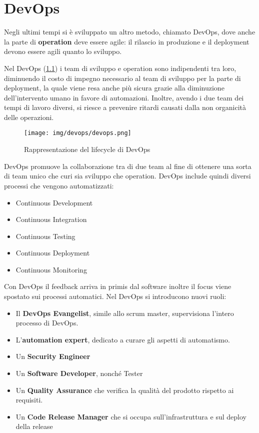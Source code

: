 \chapter{DevOps}
Negli ultimi tempi si è sviluppato un altro metodo, chiamato DevOps, dove anche la parte di \textbf{operation} deve essere agile: il rilascio in produzione e il deployment devono essere agili quanto lo
sviluppo.

Nel DevOps (\ref{fig:devops}) i team di sviluppo e operation sono indipendenti tra loro, diminuendo il costo di impegno necessario al team di sviluppo per la parte di deployment, la quale viene resa anche più sicura grazie alla diminuzione dell’intervento umano in favore di automazioni. Inoltre, avendo i due team dei tempi di lavoro diversi, si riesce a prevenire ritardi causati dalla non organicità delle operazioni.

\begin{figure}[!ht]
    \centering
    \texttt{[image: img/devops/devops.png]}
    \caption{Rappresentazione del lifecycle di DevOps}
    \label{fig:devops}
\end{figure}

DevOps promuove la collaborazione tra di due team al fine di ottenere una sorta di team unico che curi sia sviluppo che operation. DevOps include quindi diversi processi che vengono automatizzati:
\begin{itemize}
    \item Continuous Development
    \item Continuous Integration
    \item Continuous Testing
    \item Continuous Deployment 
    \item Continuous Monitoring
\end{itemize}

Con DevOps il feedback arriva in primis dal software inoltre il focus viene spostato sui processi automatici. Nel DevOps si introducono nuovi ruoli:
\begin{itemize}
    \item Il \textbf{DevOps Evangelist}, simile allo scrum master, supervisiona l'intero processo di DevOps.
    \item L'\textbf{automation expert}, dedicato a curare gli aspetti di automatismo.
    \item Un \textbf{Security Engineer}
    \item Un \textbf{Software Developer}, nonché Tester
    \item Un \textbf{Quality Assurance} che verifica la qualità del prodotto rispetto ai requisiti.
    \item Un\textbf{ Code Release Manager} che si occupa sull'infrastruttura e sul deploy della release
\end{itemize}

